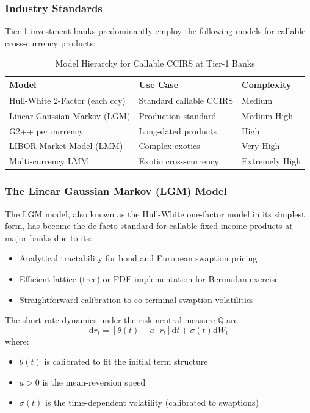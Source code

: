 \documentclass[11pt,a4paper]{article}
\theoremstyle{definition}
\newcommand{\Q}{\mathbb{Q}}
\newcommand{\diff}{\mathrm{d}}
\begin{document}
\subsubsection{Industry Standards}

Tier-1 investment banks predominantly employ the following models for callable cross-currency products:

\begin{table}[h]
\centering
\caption{Model Hierarchy for Callable CCIRS at Tier-1 Banks}
\label{tab:models}
\begin{tabular}{lll}
\toprule
\textbf{Model} & \textbf{Use Case} & \textbf{Complexity} \\
\midrule
Hull-White 2-Factor (each ccy) & Standard callable CCIRS & Medium \\
Linear Gaussian Markov (LGM) & Production standard & Medium-High \\
G2++ per currency & Long-dated products & High \\
LIBOR Market Model (LMM) & Complex exotics & Very High \\
Multi-currency LMM & Exotic cross-currency & Extremely High \\
\bottomrule
\end{tabular}
\end{table}

\subsubsection{The Linear Gaussian Markov (LGM) Model}

The LGM model, also known as the Hull-White one-factor model in its simplest form, has become the de facto standard for callable fixed income products at major banks due to its:

\begin{itemize}
    \item Analytical tractability for bond and European swaption pricing
    \item Efficient lattice (tree) or PDE implementation for Bermudan exercise
    \item Straightforward calibration to co-terminal swaption volatilities
\end{itemize}

The short rate dynamics under the risk-neutral measure $\Q$ are:
\begin{equation}
\diff r_t = [\theta(t) - a \cdot r_t] \diff t + \sigma(t) \diff W_t
\end{equation}
where:
\begin{itemize}
    \item $\theta(t)$ is calibrated to fit the initial term structure
    \item $a > 0$ is the mean-reversion speed
    \item $\sigma(t)$ is the time-dependent volatility (calibrated to swaptions)
\end{itemize}
\end{document}
